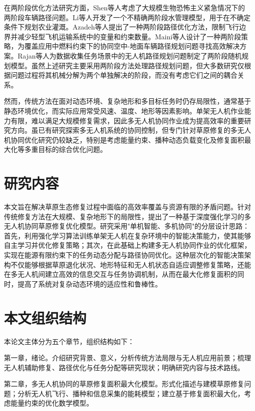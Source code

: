 \documentclass[AutoFakeBold]{LZUThesis}
\begin{document}
在两阶段优化方法研究方面，Shen等人\cite{shen2009two}考虑了大规模生物恐怖主义紧急情况下的两阶段车辆路径问题。Li等人\cite{li2010inexact}开发了一个不精确两阶段水管理模型，用于在不确定条件下规划农业灌溉。Azadeh等人\cite{azadeh2019two}提出了一种两阶段路径优化方法，限制飞行边界并减少轻型飞机运输系统中的变量和约束数量。Maini等人\cite{maini2019cooperative}设计了一种两阶段策略，为覆盖应用中燃料约束下的协同空中-地面车辆路径规划问题寻找高效解决方案。Rajan等人\cite{rajan2022routing}为数据收集任务场景中的无人机路径规划问题制定了两阶段随机规划模型。虽然上述研究主要采用两阶段方法处理路径规划问题，但大多数研究仅根据问题过程将其机械分解为两个单独解决的阶段，而没有考虑它们之间的耦合关系。

然而，传统方法在面对动态环境、复杂地形和多目标任务时仍存局限性\cite{gann2019international}，通常基于静态环境优化，而实际应用常受风速、温度、地形等因素影响。单架无人机作业能力有限，难以满足大规模修复需求，因此多无人机协同作业成为提高效率的重要研究方向\cite{dorling2016vehicle,maini2019cooperative}。虽已有研究探索多无人机系统的协同控制\cite{buters2019seed}，但专门针对草原修复的多无人机协同优化研究仍较缺乏，特别是考虑能量约束、播种动态负载变化及修复面积最大化等多重目标的综合优化问题。

\section{研究内容}
本文旨在解决草原生态修复过程中面临的高效率覆盖与资源有限的矛盾问题。针对传统修复方法在大规模、复杂地形下的局限性，提出了一种基于深度强化学习的多无人机协同草原修复优化模型。研究采用"单机智能、多机协同"的分层设计思路：首先，利用强化学习算法训练单架无人机在复杂环境中的智能决策能力，使其能够自主学习并优化修复策略；其次，在此基础上构建多无人机协同作业的优化框架，实现在能源有限约束下的任务动态分配与路径协同优化。这种层次化的智能决策架构不仅能够根据草原退化状况、地形特征和无人机状态自适应调整修复策略，还能在多无人机间建立高效的信息交互与任务协调机制，从而在最大化修复面积的同时，提高了系统对复杂动态环境的适应性和鲁棒性。

\section{本文组织结构}

本论文主体分为五个章节，组织结构如下：

第一章，绪论。介绍研究背景、意义，分析传统方法局限与无人机应用前景；梳理无人机辅助修复、路径优化与任务分配等研究现状；明确研究内容与技术路线。

第二章，多无人机协同的草原修复面积最大化模型。形式化描述与建模草原修复问题；分析无人机飞行、播种和信息采集的能耗模型；建立基于修复面积最大化，考虑能量约束的优化数学模型。
\end{document}
